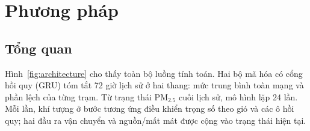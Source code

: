\documentclass[10pt,a4paper]{article}
\newcommand{\pmfine}{PM$_{2.5}$}
\begin{document}
\section{Phương pháp}

\subsection{Tổng quan}

Hình~\ref{fig:architecture} cho thấy toàn bộ luồng tính toán. Hai bộ mã hóa có cổng hồi quy (GRU) \citep{cho2014gru} tóm tắt 72 giờ lịch sử ở hai thang: mức trung bình toàn mạng và phần lệch của từng trạm. Từ trạng thái \pmfine{} cuối lịch sử, mô hình lặp 24 lần. Mỗi lần, khí tượng ở bước tương ứng điều khiển trọng số theo gió và các ô hồi quy; hai đầu ra vận chuyển và nguồn/mất mát được cộng vào trạng thái hiện tại.
\end{document}
